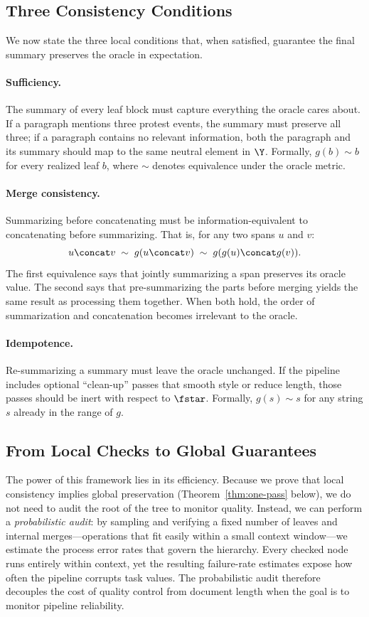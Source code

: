 \subsection{Three Consistency Conditions}

We now state the three local conditions that, when satisfied, guarantee the final summary preserves the oracle in expectation.

\paragraph{Sufficiency.} The summary of every leaf block must capture everything the oracle cares about. If a paragraph mentions three protest events, the summary must preserve all three; if a paragraph contains no relevant information, both the paragraph and its summary should map to the same neutral element in $\Y$. Formally, $g(b) \sim b$ for every realized leaf $b$, where $\sim$ denotes equivalence under the oracle metric.

\paragraph{Merge consistency.} Summarizing before concatenating must be information-equivalent to concatenating before summarizing. That is, for any two spans $u$ and $v$:
\[
u \concat v \;\sim\; g(u \concat v) \;\sim\; g(g(u) \concat g(v)).
\]
The first equivalence says that jointly summarizing a span preserves its oracle value. The second says that pre-summarizing the parts before merging yields the same result as processing them together. When both hold, the order of summarization and concatenation becomes irrelevant to the oracle.

\paragraph{Idempotence.} Re-summarizing a summary must leave the oracle unchanged. If the pipeline includes optional ``clean-up'' passes that smooth style or reduce length, those passes should be inert with respect to $\fstar$. Formally, $g(s) \sim s$ for any string $s$ already in the range of $g$.

\subsection{From Local Checks to Global Guarantees}

The power of this framework lies in its efficiency. Because we prove that local consistency implies global preservation (Theorem~\ref{thm:one-pass} below), we do not need to audit the root of the tree to monitor quality. Instead, we can perform a \emph{probabilistic audit}: by sampling and verifying a fixed number of leaves and internal merges---operations that fit easily within a small context window---we estimate the process error rates that govern the hierarchy. Every checked node runs entirely within context, yet the resulting failure-rate estimates expose how often the pipeline corrupts task values. The probabilistic audit therefore decouples the cost of quality control from document length when the goal is to monitor pipeline reliability.

